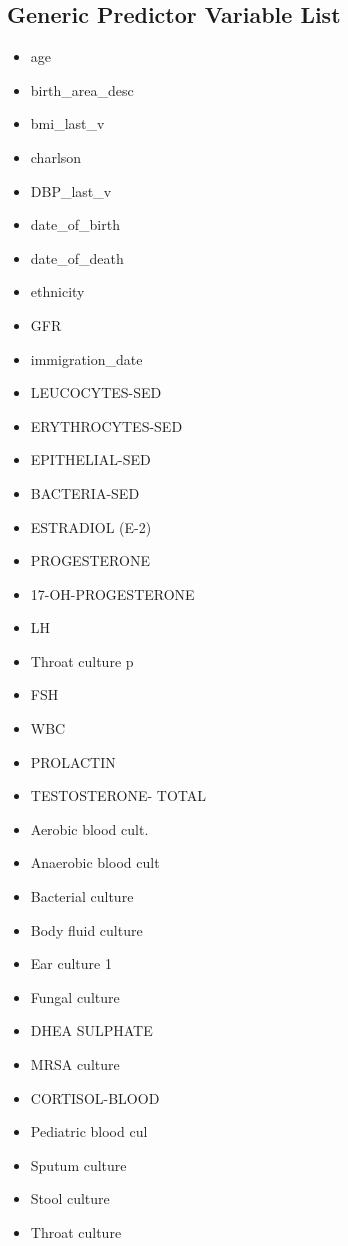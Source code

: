 \documentclass[a4paper,12pt]{article}
\begin{document}
\begin{appendices}
   		\section{Generic Predictor Variable List}
   		\begin{itemize}
   			\itemsep0em 
   			\item age
   			\item birth\_area\_desc
   			\item bmi\_last\_v
   			\item charlson
   			\item DBP\_last\_v
   			\item date\_of\_birth
   			\item date\_of\_death
   			\item ethnicity
   			\item GFR
   			\item immigration\_date
   			\item LEUCOCYTES-SED
   			\item ERYTHROCYTES-SED
   			\item EPITHELIAL-SED
   			\item BACTERIA-SED
   			\item ESTRADIOL (E-2)
   			\item PROGESTERONE
   			\item 17-OH-PROGESTERONE
   			\item LH
   			\item Throat culture p
   			\item FSH
   			\item WBC
   			\item PROLACTIN
   			\item TESTOSTERONE- TOTAL
   			\item Aerobic blood cult.
   			\item Anaerobic blood cult
   			\item Bacterial culture
   			\item Body fluid culture
   			\item Ear culture 1
   			\item Fungal culture
   			\item DHEA SULPHATE
   			\item MRSA culture
   			\item CORTISOL-BLOOD
   			\item Pediatric blood cul
   			\item Sputum culture
   			\item Stool culture
   			\item Throat culture

\end{itemize}
\end{appendices}
\end{document}
